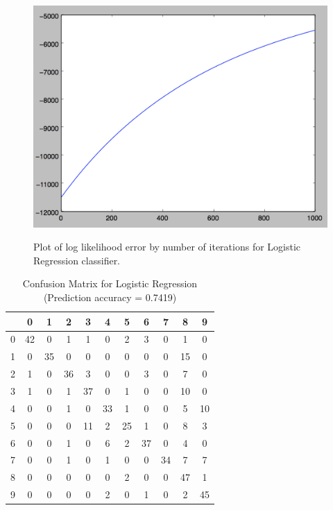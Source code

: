 \documentclass[11pt]{article}
\begin{document}
\begin{figure}[h]
\centerline{\includegraphics[scale=.6]{images/loglikelihood.png}}

\centerline{Plot of log likelihood error by number of iterations for Logistic Regression classifier.}
\end{figure}

\begin{table}[!th]
\centering
\begin{tabular}{|c|cccccccccc|}
\hline
 & 0 & 1 & 2 & 3 & 4 & 5 & 6 & 7 & 8 & 9 \\
\hline
0 & 42 & 0 & 1 & 1 & 0 & 2 & 3 & 0 & 1 & 0 \\
1 & 0 & 35 & 0 & 0 & 0 & 0 & 0 & 0 & 15 & 0 \\
2 & 1 & 0 & 36 & 3 & 0 & 0 & 3 & 0 & 7 & 0 \\
3 & 1 & 0 & 1 & 37 & 0 & 1 & 0 & 0 & 10 & 0 \\
4 & 0 & 0 & 1 & 0 & 33 & 1 & 0 & 0 & 5 & 10 \\
5 & 0 & 0 & 0 & 11 & 2 & 25 & 1 & 0 & 8 & 3 \\
6 & 0 & 0 & 1 & 0 & 6 & 2 & 37 & 0 & 4 & 0 \\
7 & 0 & 0 & 1 & 0 & 1 & 0 & 0 & 34 & 7 & 7 \\
8 & 0 & 0 & 0 & 0 & 0 & 2 & 0 & 0 & 47 & 1 \\
9 & 0 & 0 & 0 & 0 & 2 & 0 & 1 & 0 & 2 & 45 \\
\hline
\end{tabular}
\caption{Confusion Matrix for Logistic Regression (Prediction accuracy = 0.7419)}
\label{ex:table}
\end{table}
\end{document}
